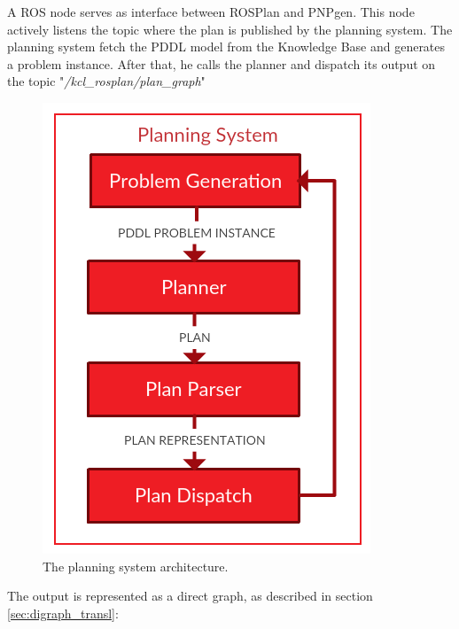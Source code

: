\documentclass[pdftex,12pt,a4paper]{report}
\begin{document}
\noindent A ROS node serves as interface between ROSPlan and PNPgen. This node actively listens the topic where the plan is published by the planning system. 
\noindent The planning system fetch the PDDL model from the Knowledge Base and generates a problem instance.
After that, he calls the planner and dispatch its output on the topic "\textit{/kcl\_rosplan/plan\_graph}"

\begin{figure}[H]
	\centering
	\includegraphics[scale=0.3]{images/dia_system.png}
	\caption{The planning system architecture.}
\end{figure}

\noindent The output is represented as a direct graph, as described in section \ref{sec:digraph_transl}:
\end{document}
